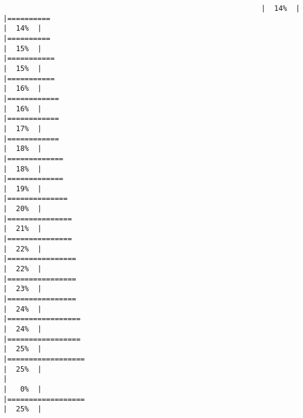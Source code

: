 \documentclass[
]{article}
\begin{document}
\begin{verbatim}
                                                            |  14%  |                                                                              |==========                                                            |  14%  |                                                                              |==========                                                            |  15%  |                                                                              |===========                                                           |  15%  |                                                                              |===========                                                           |  16%  |                                                                              |============                                                          |  16%  |                                                                              |============                                                          |  17%  |                                                                              |============                                                          |  18%  |                                                                              |=============                                                         |  18%  |                                                                              |=============                                                         |  19%  |                                                                              |==============                                                        |  20%  |                                                                              |===============                                                       |  21%  |                                                                              |===============                                                       |  22%  |                                                                              |================                                                      |  22%  |                                                                              |================                                                      |  23%  |                                                                              |================                                                      |  24%  |                                                                              |=================                                                     |  24%  |                                                                              |=================                                                     |  25%  |                                                                              |==================                                                    |  25%  |                                                                              |                                                                      |   0%  |                                                                              |==================                                                    |  25%  |                                                                              
\end{verbatim}
\end{document}
